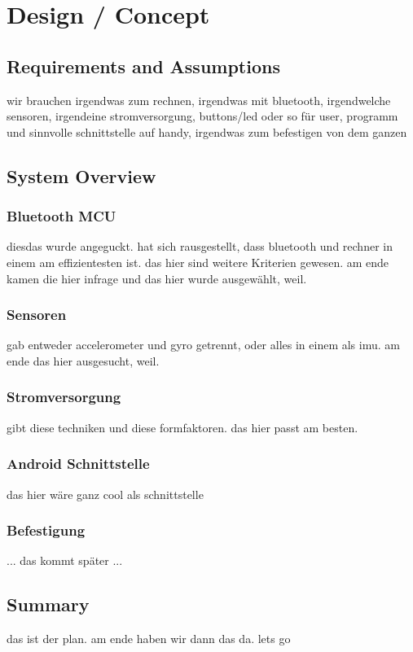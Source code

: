 \chapter{Design / Concept}
\label{ch:design}

\section{Requirements and Assumptions}
wir brauchen irgendwas zum rechnen, irgendwas mit bluetooth, irgendwelche sensoren, irgendeine stromversorgung, buttons/led oder so für user, programm und sinnvolle schnittstelle auf handy, irgendwas zum befestigen von dem ganzen

\section{System Overview}

\subsection{Bluetooth MCU}
diesdas wurde angeguckt. hat sich rausgestellt, dass bluetooth und rechner in einem am effizientesten ist. das hier sind weitere Kriterien gewesen. am ende kamen die hier infrage und das hier wurde ausgewählt, weil.

\subsection{Sensoren}
gab entweder accelerometer und gyro getrennt, oder alles in einem als imu. am ende das hier ausgesucht, weil.

\subsection{Stromversorgung}
gibt diese techniken und diese formfaktoren. das hier passt am besten.

\subsection{Android Schnittstelle}
das hier wäre ganz cool als schnittstelle

\subsection{Befestigung}
... das kommt später ...

\section{Summary}
das ist der plan. am ende haben wir dann das da. lets go